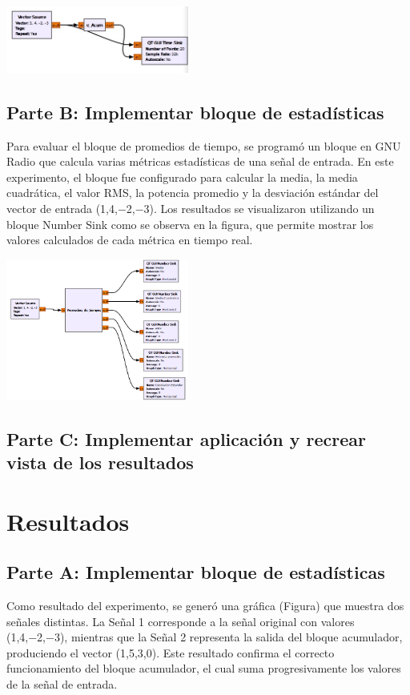 \documentclass{journal}[IEEEtran, twocolumn]             %
\begin{document}
\begin{multicols}{2}
    \begin{center}
    \includegraphics[width=0.45\textwidth]{figs/F1.png}
    \caption{Figura 1: Diagrama de flujo}
    \end{center}


\subsection{Parte B: Implementar bloque de estadísticas}

    Para evaluar el bloque de promedios de tiempo, se programó un bloque en GNU Radio que calcula varias métricas estadísticas de una señal de entrada. En este experimento, el bloque fue configurado para calcular la media, la media cuadrática, el valor RMS, la potencia promedio y la desviación estándar del vector de entrada (1,4,−2,−3). Los resultados se visualizaron utilizando un bloque Number Sink como se observa en la figura, que permite mostrar los valores calculados de cada métrica en tiempo real.
    
        \begin{center}
        \includegraphics[width=0.45\textwidth]{figs/F4.png}
        \caption{Figura 2: Diagrama de flujo}
        \end{center}



\subsection{Parte C: Implementar aplicación y recrear vista de los resultados}

    
\section{Resultados}
\subsection{Parte A: Implementar bloque de estadísticas}
Como resultado del experimento, se generó una gráfica (Figura) que muestra dos señales distintas. La Señal 1 corresponde a la señal original con valores (1,4,−2,−3), mientras que la Señal 2 representa la salida del bloque acumulador, produciendo el vector (1,5,3,0). Este resultado confirma el correcto funcionamiento del bloque acumulador, el cual suma progresivamente los valores de la señal de entrada.


\end{multicols}
\end{document}
